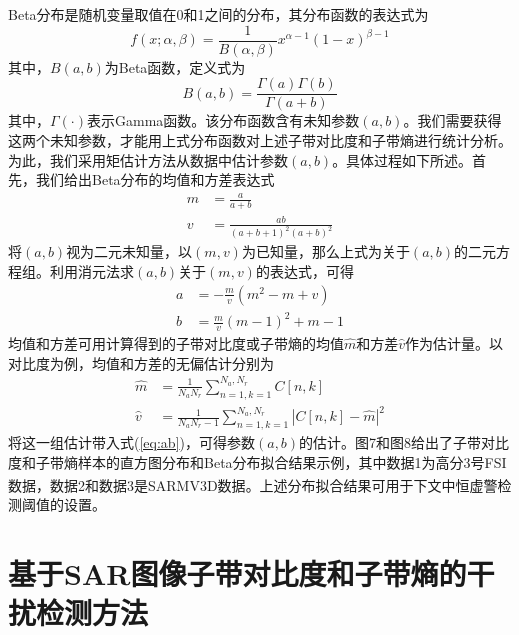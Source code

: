\documentclass[10.5pt,UTF8]{JR}
\theoremstyle{mystyle}
\newcommand{\upcite}[1]{\textsuperscript{\cite{#1}}}
\begin{document}
Beta分布是随机变量取值在0和1之间的分布，其分布函数的表达式为
\begin{equation}
    f\left(x;\alpha,\beta\right)=\frac1{B\left(\alpha,\beta\right)}x^{\alpha-1}(1-x)^{\beta-1}
\end{equation}
其中，$B(a,b)$为Beta函数，定义式为
\begin{equation}
    B(a,b)=\frac{\Gamma(a)\Gamma(b)}{\Gamma(a+b)}
\end{equation}
其中，$\Gamma(\cdot)$表示Gamma函数。该分布函数含有未知参数$(a,b)$。我们需要获得这两个未知参数，才能用上式分布函数对上述子带对比度和子带熵进行统计分析。为此，我们采用矩估计方法从数据中估计参数$(a,b)$。具体过程如下所述。首先，我们给出Beta分布的均值和方差表达式
\begin{subequations}
\begin{align}
  m & =\frac{a}{a+b} \\
 v &  = \frac{ab}{(a+b+1)^2(a+b)^2}
\end{align}
\end{subequations}
将$(a,b)$视为二元未知量，以$(m,v)$为已知量，那么上式为关于$(a,b)$的二元方程组。利用消元法求$(a,b)$关于$(m,v)$的表达式，可得
\begin{subequations}\label{eq:ab}
\begin{align}
  a &=-\frac{m}{v}(m^2-m+v) \\
  b & =\frac{m}{v}(m-1)^2 + m -1
\end{align}
\end{subequations}
均值和方差可用计算得到的子带对比度或子带熵的均值$\hat{m}$和方差$\hat{v}$作为估计量。以对比度为例，均值和方差的无偏估计分别为
\begin{subequations}
\begin{align}
\hat{m} &=  \frac{1}{N_a N_r}   \sum_{n=1,k=1}^{N_a,N_r} C[n,k] \\
\hat{v} &= \frac{1}{N_a N_r -1} \sum_{n=1,k=1}^{N_a,N_r} |C[n,k]-\hat{m}|^2
\end{align}
\end{subequations}
将这一组估计带入式(\ref{eq:ab})，可得参数$(a,b)$的估计。图7和图8给出了子带对比度和子带熵样本的直方图分布和Beta分布拟合结果示例，其中数据1为高分3号FSI数据，数据2和数据3是SARMV3D数据\upcite{qiu2021sarmv3d}。上述分布拟合结果可用于下文中恒虚警检测阈值的设置。



\section{基于SAR图像子带对比度和子带熵的干扰检测方法}\label{sec:dtc}
\end{document}
